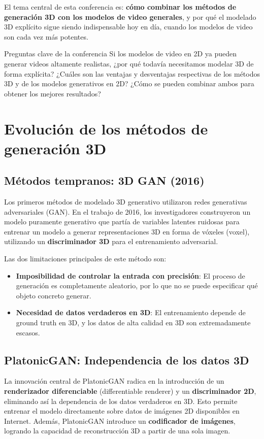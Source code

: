 \documentclass[a4paper]{article}
\begin{document}
El tema central de esta conferencia es: \textbf{cómo combinar los métodos de generación 3D con los modelos de video generales}, y por qué el modelado 3D explícito sigue siendo indispensable hoy en día, cuando los modelos de video son cada vez más potentes.

\begin{importantbox}{Preguntas clave de la conferencia}
Si los modelos de video en 2D ya pueden generar videos altamente realistas, ¿por qué todavía necesitamos modelar 3D de forma explícita? ¿Cuáles son las ventajas y desventajas respectivas de los métodos 3D y de los modelos generativos en 2D? ¿Cómo se pueden combinar ambos para obtener los mejores resultados?
\end{importantbox}
\section{Evolución de los métodos de generación 3D}

\subsection{Métodos tempranos: 3D GAN (2016)}

Los primeros métodos de modelado 3D generativo utilizaron redes generativas adversariales (GAN). En el trabajo de 2016, los investigadores construyeron un modelo puramente generativo que partía de variables latentes ruidosas para entrenar un modelo a generar representaciones 3D en forma de vóxeles (voxel), utilizando un \textbf{discriminador 3D} para el entrenamiento adversarial.

Las dos limitaciones principales de este método son:
\begin{itemize}
    \item \textbf{Imposibilidad de controlar la entrada con precisión}: El proceso de generación es completamente aleatorio, por lo que no se puede especificar qué objeto concreto generar.
    \item \textbf{Necesidad de datos verdaderos en 3D}: El entrenamiento depende de ground truth en 3D, y los datos de alta calidad en 3D son extremadamente escasos.
\end{itemize}

\subsection{PlatonicGAN: Independencia de los datos 3D}

La innovación central de PlatonicGAN radica en la introducción de un \textbf{renderizador diferenciable} (differentiable renderer) y un \textbf{discriminador 2D}, eliminando así la dependencia de los datos verdaderos en 3D. Esto permite entrenar el modelo directamente sobre datos de imágenes 2D disponibles en Internet. Además, PlatonicGAN introduce un \textbf{codificador de imágenes}, logrando la capacidad de reconstrucción 3D a partir de una sola imagen.
\end{document}
